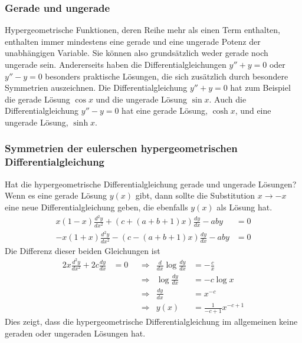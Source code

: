 \subsubsection{Gerade und ungerade}
Hypergeometrische Funktionen, deren Reihe mehr als einen Term
enthalten, enthalten immer mindestens eine gerade und eine ungerade
Potenz der unabhängigen Variable.
Sie können also grundsätzlich weder gerade noch ungerade sein.
Andererseits haben die Differentialgleichungen $y''+y=0$ oder $y''-y=0$
besonders praktische Lösungen, die sich zusätzlich durch besondere
Symmetrien auszeichnen.
Die Differentialgleichung $y''+y=0$ hat zum Beispiel die gerade
Lösung $\cos x$ und die ungerade Lösung $\sin x$.
Auch die Differentialgleichung $y''-y=0$ hat eine gerade Lösung,
$\cosh x$, und eine ungerade Lösung, $\sinh x$.

\subsubsection{Symmetrien der eulerschen hypergeometrischen
Differentialgleichung}
Hat die hypergeometrische Differentialgleichung gerade und
ungerade Lösungen?
Wenn es eine gerade Lösung $y(x)$ gibt, dann sollte die Substitution
$x \to -x$ eine neue Differentialgleichung geben, die ebenfalls $y(x)$
als Lösung hat.
\begin{align*}
 x(1-x)\frac{d^2y}{dx^2} + (c+(a+b+1)x)\frac{dy}{dx}-aby&=0
\\
-x(1+x)\frac{d^2y}{dx^2} - (c-(a+b+1)x)\frac{dy}{dx}-aby&=0
\end{align*}
Die Differenz dieser beiden Gleichungen ist
\begin{align*}
2x\frac{d^2y}{dx^2} +2c \frac{dy}{dx}&=0
&&\Rightarrow&
\frac{d}{dx} \log \frac{dy}{dx} &= -\frac{c}{x}
\\
&&&\Rightarrow&
\log \frac{dy}{dx} &= -c\log x
\\
&&&\Rightarrow&
\frac{dy}{dx} &= x^{-c}
\\
&&&\Rightarrow&
y(x) &= \frac{1}{-c+1}x^{-c+1}
\end{align*}
Dies zeigt, dass die hypergeometrische Differentialgleichung im
allgemeinen keine geraden oder ungeraden Lösungen hat.

